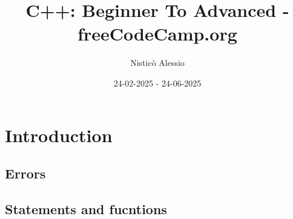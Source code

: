\documentclass [twoside] {report}
\begin{document}
\author{Nisticò Alessio}
\title{C++: Beginner To Advanced - freeCodeCamp.org}
\date{24-02-2025 - 24-06-2025}
\maketitle

\tableofcontents 			%

\chapter{Introduction}
\section{Errors}

\section{Statements and fucntions}
\end{document}
